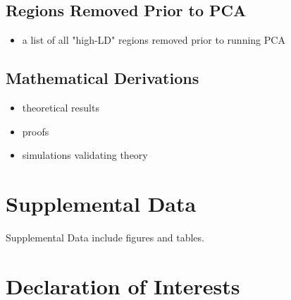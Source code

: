 \documentclass[12pt]{article}
\newcommand{\add}[1]{{\color{red}{[... #1 ...]}}}
\begin{document}

\subsection{Regions Removed Prior to PCA}

\begin{itemize}
\item a list of all "high-LD" regions removed prior to running PCA
\end{itemize}

\subsection{Mathematical Derivations}

\begin{itemize}
\item theoretical results
\item proofs
\item simulations validating theory
\end{itemize}


\newpage
\section*{Supplemental Data}


Supplemental Data include \add{??} figures and \add{??} tables.



\section*{Declaration of Interests}

\end{document}
